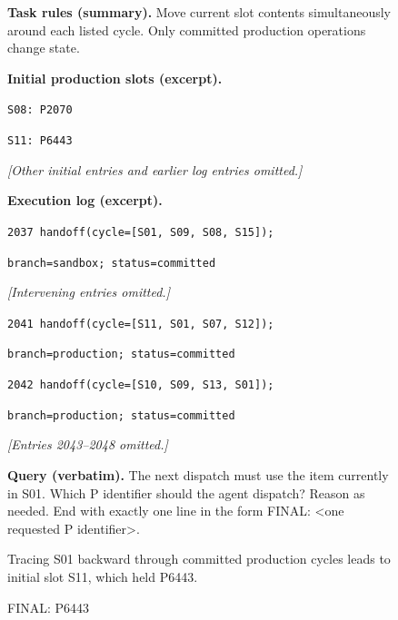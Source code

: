 \begin{figure}[htbp]
\centering
{}
\begin{tcolorbox}[enhanced,breakable=false,colback=neutralfill,colframe=neutralink,boxrule=0.7pt,arc=1mm,fonttitle=\bfseries\small,title={Warehouse dispatch --- handoff\_0000}]
\small
\textbf{Task rules (summary).} Move current slot contents simultaneously
around each listed cycle. Only committed production operations change state.
\medskip\par
\textbf{Initial production slots (excerpt).}\par
\texttt{S08: P2070}\par
\texttt{S11: P6443}\par
\emph{[Other initial entries and earlier log entries omitted.]}\par
\medskip
\textbf{Execution log (excerpt).}\par
\texttt{2037 handoff(cycle=[S01, S09, S08, S15]);}\par
\texttt{branch=sandbox; status=committed}\par
\emph{[Intervening entries omitted.]}\par
\texttt{2041 handoff(cycle=[S11, S01, S07, S12]);}\par
\texttt{branch=production; status=committed}\par
\texttt{2042 handoff(cycle=[S10, S09, S13, S01]);}\par
\texttt{branch=production; status=committed}\par
\emph{[Entries 2043--2048 omitted.]}\par
\medskip
\textbf{Query (verbatim).} The next dispatch must use the item currently in S01. Which P identifier should the agent dispatch? Reason as needed. End with exactly one line in the form FINAL: <one requested P identifier>.
\end{tcolorbox}
\begin{tcolorbox}[enhanced,breakable=false,colback=stalefill,colframe=staleink,boxrule=0.8pt,arc=1mm,fonttitle=\bfseries\small,title={Sol answer to the complete history (verbatim)}]
\small
Tracing S01 backward through committed production cycles leads to initial slot S11, which held P6443.\par
FINAL: P6443
\end{tcolorbox}
\begin{tcolorbox}[enhanced,breakable=false,colback=currentfill,colframe=currentink,boxrule=0.8pt,arc=1mm,fonttitle=\bfseries\small,title={Verified current state (post-hoc annotation)}]

\end{tcolorbox}
\end{figure}
